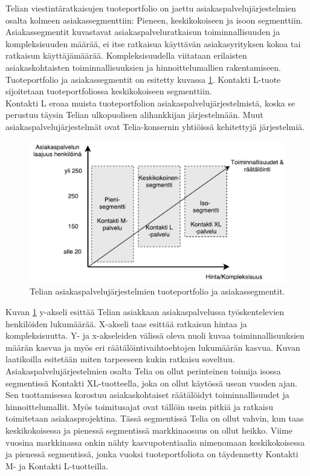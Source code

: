 \documentclass[finnish,12pt,a4paper,pdftex]{article}
\begin{document}
Telian viestintäratkaisujen tuoteportfolio on jaettu asiakaspalvelujärjestelmien osalta kolmeen asiakassegmenttiin: Pieneen, keskikokoiseen ja isoon segmenttiin. Asiakassegmentit kuvastavat asiakaspalveluratkaisun toiminnallisuuden ja kompleksisuuden määrää, ei itse ratkaisua käyttävän asiakasyrityksen kokoa tai ratkaisun käyttäjämäärää. Kompleksisuudella viitataan erilaisten asiakaskohtaisten toiminnallisuuksien ja hinnoittelumallien rakentamiseen. Tuoteportfolio ja asiakassegmentit on esitetty kuvassa \ref{fig:segmentit}. Kontakti L-tuote sijoitetaan tuoteportfoliossa keskikokoiseen segmenttiin.\\

Kontakti L eroaa muista tuoteportfolion asiakaspalvelujärjestelmistä, koska se perustuu täysin Telian ulkopuolisen alihankkijan järjestelmään. Muut asiakaspalvelujärjestelmät ovat Telia-konsernin yhtiöissä kehitettyjä järjestelmiä.\\ 

\begin{figure}[!h]
    \centering
    \includegraphics[scale=0.5]{images/segmentit.pdf}
    \caption{Telian asiakaspalvelujärjestelmien tuoteportfolio ja asiakassegmentit.}
    \label{fig:segmentit}
\end{figure}

Kuvan \ref{fig:segmentit} y-akseli esittää Telian asiakkaan asiakaspalvelussa työskentelevien henkilöiden lukumäärää. X-akseli taas esittää ratkaisun hintaa ja kompleksisuutta. Y- ja x-akseleiden välissä oleva nuoli kuvaa toiminnallisuuksien määrän kasvua ja myös eri räätälöintivaihtoehtojen lukumäärän kasvua. Kuvan laatikoilla esitetään miten tarpeeseen kukin ratkaisu soveltuu.\\

Asiakaspalvelujärjestelmien osalta Telia on ollut perinteinen toimija isossa segmentissä Kontakti XL-tuotteella, joka on ollut käytössä usean vuoden ajan. Sen tuottamisessa korostuu asiakaskohtaiset räätälöidyt toiminnallisuudet ja hinnoittelumallit. Myös toimitusajat ovat tällöin usein pitkiä ja ratkaisu toimitetaan asiakasprojektina. Tässä segmentissä Telia on ollut vahvin, kun taas keskikokoisessa ja pienessä segmentissä markkinaosuus on ollut heikko. Viime vuosina markkinassa onkin nähty kasvupotentiaalia nimenomaan keskikokoisessa ja pienessä segmentissä, jonka vuoksi tuoteportfoliota on täydennetty Kontakti M- ja Kontakti L-tuotteilla.\\
\end{document}
